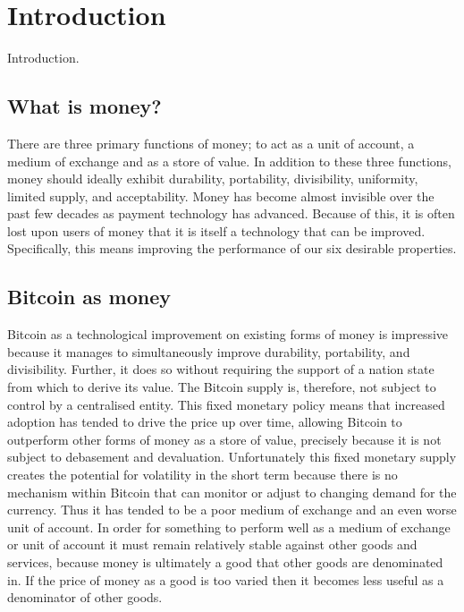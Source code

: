 \section{Introduction}

Introduction. \\

\subsection{What is money?}

There are three primary functions of money; to act as a unit of account, a medium of exchange and as a store of value. In addition to these three functions, money should ideally exhibit durability, portability, divisibility, uniformity, limited supply, and acceptability. Money has become almost invisible over the past few decades as payment technology has advanced. Because of this, it is often lost upon users of money that it is itself a technology that can be improved. Specifically, this means improving the performance of our six desirable properties.

\subsection{Bitcoin as money}

Bitcoin as a technological improvement on existing forms of money is impressive because it manages to simultaneously improve durability, portability, and divisibility. Further, it does so without requiring the support of a nation state from which to derive its value. The Bitcoin supply is, therefore, not subject to control by a centralised entity. This fixed monetary policy means that increased adoption has tended to drive the price up over time, allowing Bitcoin to outperform other forms of money as a store of value, precisely because it is not subject to debasement and devaluation. Unfortunately this fixed monetary supply creates the potential for volatility in the short term because there is no mechanism within Bitcoin that can monitor or adjust to changing demand for the currency. Thus it has tended to be a poor medium of exchange and an even worse unit of account. In order for something to perform well as a medium of exchange or unit of account it must remain relatively stable against other goods and services, because money is ultimately a good that other goods are denominated in. If the price of money as a good is too varied then it becomes less useful as a denominator of other goods. \\

